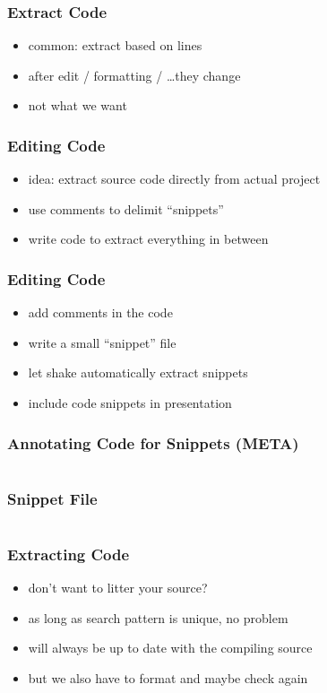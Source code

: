 \documentclass{beamer}
\begin{document}
\begin{frame}[fragile]
  \frametitle{Extract Code}
  \begin{itemize}
  \item common: extract based on lines
  \item after edit / formatting / \ldots they change
  \item not what we want
  \end{itemize}
\end{frame}

\begin{frame}
  \frametitle{Editing Code}
  \begin{itemize}
  \item idea: extract source code directly from actual project
  \item use comments to delimit ``snippets''
  \item write code to extract everything in between
  \end{itemize}
\end{frame}

\begin{frame}
  \frametitle{Editing Code}
  \begin{itemize}
  \item add comments in the code
  \item write a small ``snippet'' file
  \item let shake automatically extract snippets
  \item include code snippets in presentation
  \end{itemize}
\end{frame}

\begin{frame}
  \frametitle{Annotating Code for Snippets (META)}
  \inputminted[autogobble]{haskell}{snippets/outer-pdf-rule.hs}
\end{frame}

\begin{frame}
  \frametitle{Snippet File}
  \inputminted{text}{snippets/pdf-rule.snippet}
\end{frame}

\begin{frame}
  \frametitle{Extracting Code}
  \begin{itemize}
  \item don't want to litter your source?
  \item as long as search pattern is unique, no problem
  \item will always be up to date with the compiling source
  \item but we also have to format and maybe check again
  \end{itemize}
\end{frame}
\end{document}

